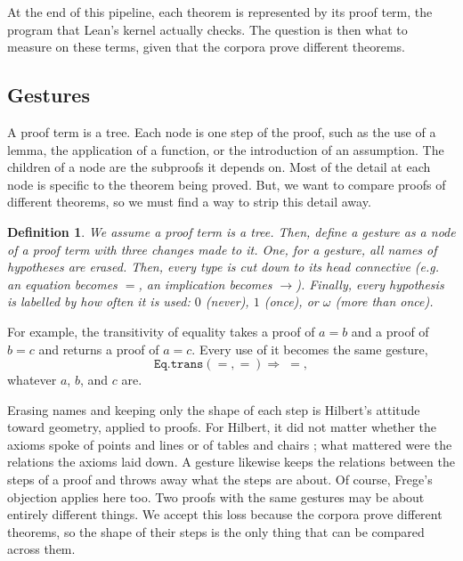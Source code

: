 \documentclass{article}
\newtheorem*{definition}{Definition}
\begin{document}
At the end of this pipeline, each theorem is represented by its proof term, the program that Lean's kernel actually
checks. The question is then what to measure on these terms, given that the corpora prove different theorems.

\subsection{Gestures}
A proof term is a tree. Each node is one step of the proof, such as the use of a lemma, the application of a function,
or the introduction of an assumption. The children of a node are the subproofs it depends on. Most of the detail at
each node is specific to the theorem being proved. But, we want to compare proofs of different theorems, so we must find a way to strip this
detail away.

\begin{definition}
We assume a proof term is a tree.
Then, define a \textit{gesture} as a node of a proof term with three changes made to it. One, for a gesture, all names of 
hypotheses are erased. Then, every type is cut down to its head connective (e.g. an equation becomes $=$, an implication becomes 
$\to$). Finally, every hypothesis is labelled by how often it is used: $0$ (never), $1$ (once), or $\omega$ (more than once).
\end{definition}

For example, the transitivity of equality takes a proof of $a=b$ and a proof of $b=c$ and returns a proof of $a=c$.
Every use of it becomes the same gesture,
\[
\mathtt{Eq.trans}(=,=)\Rightarrow\;=,
\]
whatever $a$, $b$, and $c$ are.

Erasing names and keeping only the shape of each step is Hilbert's attitude toward geometry, applied to proofs. For Hilbert, it did not matter whether the axioms spoke of points
and lines or of tables and chairs \textit{\parencite{blumenthal1935}}; what mattered were the relations the axioms laid down. A gesture likewise keeps the
relations between the steps of a proof and throws away what the steps are about. Of course, Frege's objection applies \textit{\parencite{frege1980}}
here too. Two proofs with the same gestures may be about entirely different things. We accept this loss because the corpora prove
different theorems, so the shape of their steps is the only thing that can be compared across them.
\end{document}
